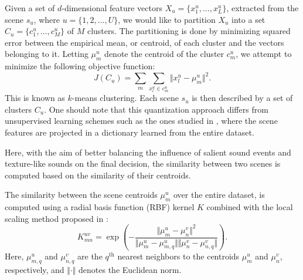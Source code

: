 \documentclass[journal]{IEEEtran}
\newcommand{\ja}[1]{\textcolor{magenta}{Joakim : #1}}
\begin{document}
Given a set of $d$-dimensional feature vectors $X_u = \{x_1^u, \ldots, x_L^u\}$, extracted from the scene $s_u$, where $u=\lbrace 1,2,\ldots,U\rbrace$, we would like to partition $X_u$ into a set $C_u = \{c^u_1, \ldots, c^u_M\}$ of $M$ clusters. The partitioning is done by minimizing squared error between the empirical mean, or centroid, of each cluster and the vectors belonging to it. Letting $\mu_m^u$ denote the centroid of the cluster $c_m^u$, we attempt to minimize the following objective function:
\begin{equation}
J(C_u)=\sum\limits_{m} \sum_{x^u_l\in c^u_m} \Vert x_l^u - \mu_m^u \Vert^2\mbox{.}
\end{equation}
This is known as $k$-means clustering.
Each scene $s_u$ is then described by a set of clusters $C_u$. One should note that this quantization approach differs from unsupervised learning schemes such as the ones studied in \cite{bisot2016acoustic}, where the scene features are projected in a dictionary learned from the entire dataset.


Here, with the aim of better balancing the influence of salient sound events and texture-like sounds on the final decision, the similarity between two scenes is computed based on the similarity of their centroids.

The similarity between the scene centroids $\mu_m^u$ over the entire dataset, is computed using a radial basis function (RBF) kernel $K$ combined with the local scaling method proposed in \cite{selfTuneManor2004}:
\begin{equation}
\label{eq:kc}
K_{mn}^{uv} = \exp\left( - \dfrac{\Vert \mu_m^u - \mu_n^v \Vert^2}{\Vert \mu_m^u - \mu_{m,q}^u \Vert \Vert \mu_n^v - \mu_{n,q}^v \Vert} \right).
\end{equation} 
Here, $\mu_{m,q}^u$ and $\mu_{n,q}^v$ are the $q^{\textrm{th}}$ nearest neighbors to the centroids $\mu_m^u$ and $\mu_n^v$, respectively, and $\Vert \cdot \Vert$ denotes the Euclidean norm.
\end{document}

